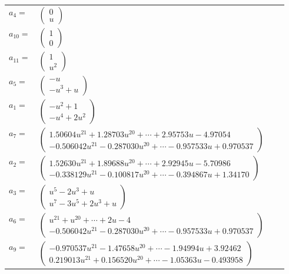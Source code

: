 \documentclass[1p]{elsarticle_modified}
\theoremstyle{definition}
\begin{document}
\begin{tabular}{m{7pt} m{180pt} m{7pt} m{180pt} }
\flushright $a_{4}=$&$\begin{pmatrix}0\\u\end{pmatrix}$ \\
\flushright $a_{10}=$&$\begin{pmatrix}1\\0\end{pmatrix}$ \\
\flushright $a_{11}=$&$\begin{pmatrix}1\\u^2\end{pmatrix}$ \\
\flushright $a_{5}=$&$\begin{pmatrix}- u\\- u^3+u\end{pmatrix}$ \\
\flushright $a_{1}=$&$\begin{pmatrix}- u^2+1\\- u^4+2 u^2\end{pmatrix}$ \\
\flushright $a_{7}=$&$\begin{pmatrix}1.50604 u^{21}+1.28703 u^{20}+\cdots+2.95753 u-4.97054\\-0.506042 u^{21}-0.287030 u^{20}+\cdots-0.957533 u+0.970537\end{pmatrix}$ \\
\flushright $a_{2}=$&$\begin{pmatrix}1.52630 u^{21}+1.89688 u^{20}+\cdots+2.92945 u-5.70986\\-0.338129 u^{21}-0.100817 u^{20}+\cdots-0.394867 u+1.34170\end{pmatrix}$ \\
\flushright $a_{3}=$&$\begin{pmatrix}u^5-2 u^3+u\\u^7-3 u^5+2 u^3+u\end{pmatrix}$ \\
\flushright $a_{6}=$&$\begin{pmatrix}u^{21}+u^{20}+\cdots+2 u-4\\-0.506042 u^{21}-0.287030 u^{20}+\cdots-0.957533 u+0.970537\end{pmatrix}$ \\
\flushright $a_{9}=$&$\begin{pmatrix}-0.970537 u^{21}-1.47658 u^{20}+\cdots-1.94994 u+3.92462\\0.219013 u^{21}+0.156520 u^{20}+\cdots-1.05363 u-0.493958\end{pmatrix}$ \\

\end{tabular}
\end{document}
